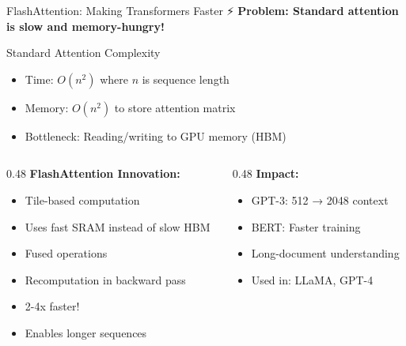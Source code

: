 \documentclass[aspectratio=169]{beamer}
\begin{document}
\begin{frame}[shrink=10]{FlashAttention: Making Transformers Faster ⚡}
\textbf{Problem: Standard attention is slow and memory-hungry!}

\vspace{0.5em}

\begin{alertblock}{Standard Attention Complexity}
\begin{itemize}\setlength{\itemsep}{0pt}
    \item Time: $O(n^2)$ where $n$ is sequence length
    \item Memory: $O(n^2)$ to store attention matrix
    \item Bottleneck: Reading/writing to GPU memory (HBM)
\end{itemize}
\end{alertblock}

\vspace{1em}

\begin{columns}[T]
\begin{column}{0.48\textwidth}
\textbf{FlashAttention Innovation:}
\begin{itemize}\setlength{\itemsep}{0pt}
    \item Tile-based computation
    \item Uses fast SRAM instead of slow HBM
    \item Fused operations
    \item Recomputation in backward pass
    \item \alert{2-4x faster!}
    \item Enables longer sequences
\end{itemize}
\end{column}

\begin{column}{0.48\textwidth}
\textbf{Impact:}
\begin{itemize}\setlength{\itemsep}{0pt}
    \item GPT-3: 512 → 2048 context
    \item BERT: Faster training
    \item Long-document understanding
    \item Used in: LLaMA, GPT-4
\end{itemize}

\vspace{1em}


\end{column}
\end{columns}
\end{frame}
\end{document}
